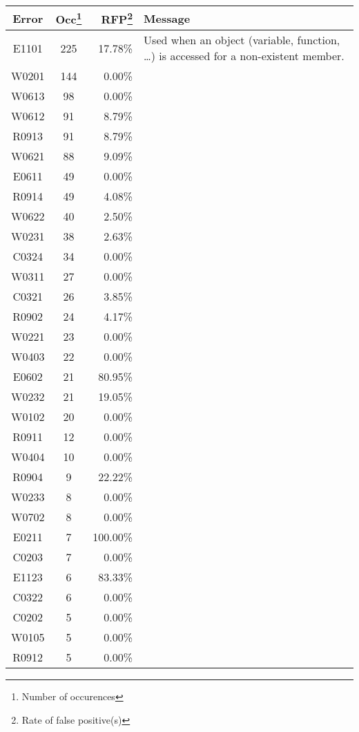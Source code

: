 \documentclass[11pt, a4paper]{article}
\begin{document}
\begin{longtable}{|c|c|r|m{9.2cm}|}
\hline
\textbf{\small{Error}} & \textbf{\small{Occ\footnote{Number of occurences}}} & \textbf{\small{RFP\footnote{Rate of false positive(s)}}} & \textbf{\small{Message}} \\
\hline
\hline
E1101 & 225 & 17.78\% & Used when an object (variable, function, \dots) is accessed for a non-existent member. \\
\hline
W0201 & 144 & 0.00\% &  \\
\hline
W0613 & 98 & 0.00\% &  \\
\hline
W0612 & 91 & 8.79\% &  \\
\hline
R0913 & 91 & 8.79\% &  \\
\hline
W0621 & 88 & 9.09\% &  \\
\hline
E0611 & 49 & 0.00\% &  \\
\hline
R0914 & 49 & 4.08\% &  \\
\hline
W0622 & 40 & 2.50\% &  \\
\hline
W0231 & 38 & 2.63\% &  \\
\hline
C0324 & 34 & 0.00\% &  \\
\hline
W0311 & 27 & 0.00\% &  \\
\hline
C0321 & 26 & 3.85\% &  \\
\hline
R0902 & 24 & 4.17\% &  \\
\hline
W0221 & 23 & 0.00\% &  \\
\hline
W0403 & 22 & 0.00\% &  \\
\hline
E0602 & 21 & 80.95\% &  \\
\hline
W0232 & 21 & 19.05\% &  \\
\hline
W0102 & 20 & 0.00\% &  \\
\hline
R0911 & 12 & 0.00\% &  \\
\hline
W0404 & 10 & 0.00\% &  \\
\hline
R0904 & 9 & 22.22\% &  \\
\hline
W0233 & 8 & 0.00\% &  \\
\hline
W0702 & 8 & 0.00\% &  \\
\hline
E0211 & 7 & 100.00\% &  \\
\hline
C0203 & 7 & 0.00\% &  \\
\hline
E1123 & 6 & 83.33\% &  \\
\hline
C0322 & 6 & 0.00\% &  \\
\hline
C0202 & 5 & 0.00\% &  \\
\hline
W0105 & 5 & 0.00\% &  \\
\hline
R0912 & 5 & 0.00\% &  \\

\end{longtable}
\end{document}
